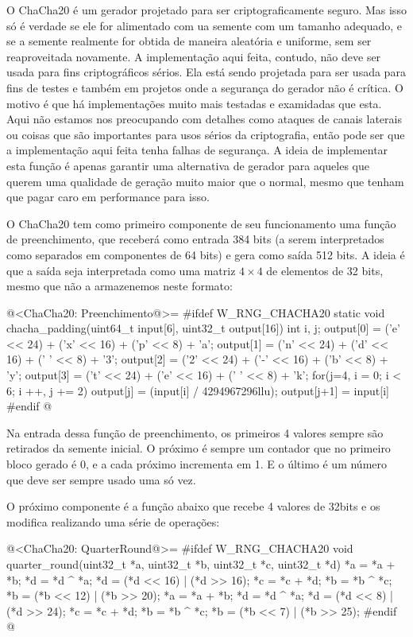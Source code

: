 O ChaCha20 é um gerador projetado para ser criptograficamente
seguro. Mas isso só é verdade se ele for alimentado com ua semente com
um tamanho adequado, e se a semente realmente for obtida de maneira
aleatória e uniforme, sem ser reaproveitada novamente. A implementação
aqui feita, contudo, não deve ser usada para fins criptográficos
sérios. Ela está sendo projetada para ser usada para fins de testes e
também em projetos onde a segurança do gerador não é crítica. O motivo
é que há implementações muito mais testadas e examidadas que
esta. Aqui não estamos nos preocupando com detalhes como ataques de
canais laterais ou coisas que são importantes para usos sérios da
criptografia, então pode ser que a implementação aqui feita tenha
falhas de segurança. A ideia de implementar esta função é apenas
garantir uma alternativa de gerador para aqueles que querem uma
qualidade de geração muito maior que o normal, mesmo que tenham que
pagar caro em performance para isso.

O ChaCha20 tem como primeiro componente de seu funcionamento uma
função de preenchimento, que receberá como entrada 384 bits (a serem
interpretados como separados em componentes de 64 bits) e gera como
saída 512 bits. A ideia é que a saída seja interpretada como uma
matriz $4\times 4$ de elementos de 32 bits, mesmo que não a
armazenemos neste formato:

@<ChaCha20: Preenchimento@>=
#ifdef W_RNG_CHACHA20
static void chacha_padding(uint64_t input[6], uint32_t output[16]){
  int i, j;
  output[0] = ('e' << 24) + ('x' << 16) + ('p' << 8) + 'a';
  output[1] = ('n' << 24) + ('d' << 16) + (' ' << 8) + '3';
  output[2] = ('2' << 24) + ('-' << 16) + ('b' << 8) + 'y';
  output[3] = ('t' << 24) + ('e' << 16) + (' ' << 8) + 'k';
  for(j=4, i = 0; i < 6; i ++, j += 2){
    output[j] = (input[i] / 4294967296llu);
    output[j+1] = input[i] %
  }
}
#endif
@

Na entrada dessa função de preenchimento, os primeiros 4 valores
sempre são retirados da semente inicial. O próximo é sempre um
contador que no primeiro bloco gerado é 0, e a cada próximo incrementa
em 1. E o último é um número que deve ser sempre usado uma só vez.

O próximo componente é a função abaixo que recebe 4 valores de 32bits
e os modifica realizando uma série de operações:

@<ChaCha20: QuarterRound@>=
#ifdef W_RNG_CHACHA20
void quarter_round(uint32_t *a, uint32_t *b, uint32_t *c, uint32_t *d){
  *a = *a + *b;
  *d = *d ^ *a;
  *d = (*d << 16) | (*d >> 16);
  *c = *c + *d;
  *b = *b ^ *c;
  *b = (*b << 12) | (*b >> 20);
  *a = *a + *b;
  *d = *d ^ *a;
  *d = (*d << 8) | (*d >> 24);
  *c = *c + *d;
  *b = *b ^ *c;
  *b = (*b << 7) | (*b >> 25);
}
#endif
@

